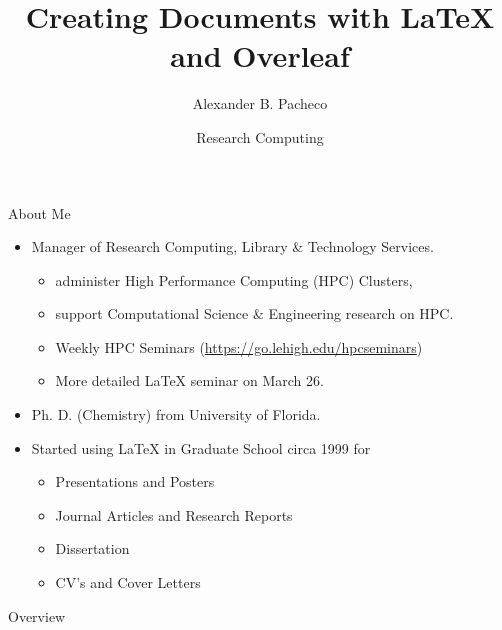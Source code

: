 \documentclass[style=lehigh,orient=landscape]{powerdot}
\title{Creating Documents with \LaTeX{} and Overleaf}
\author{Alexander B. Pacheco}
\date{Research Computing}
\begin{document}
\maketitle

\begin{wideslide}[toc=,bm=]{About Me}
\begin{itemize}
    \item Manager of Research Computing, Library \& Technology Services.
    \begin{itemize}
        \item administer High Performance Computing (HPC) Clusters,
        \item support Computational Science \& Engineering research on HPC.
        \item Weekly HPC Seminars (\url{https://go.lehigh.edu/hpcseminars})
        \item More detailed \LaTeX{} seminar on March 26.
    \end{itemize}
    \item Ph. D. (Chemistry) from University of Florida.
    \item Started using \LaTeX{} in Graduate School circa 1999 for
    \begin{itemize}
        \item Presentations and Posters
        \item Journal Articles and Research Reports
        \item Dissertation
        \item CV's and Cover Letters
    \end{itemize}
\end{itemize}
\end{wideslide}

\begin{wideslide}[toc=,bm=]{Overview}
  \tableofcontents[content=sections]
\end{wideslide}
\scriptsize
\end{document}
